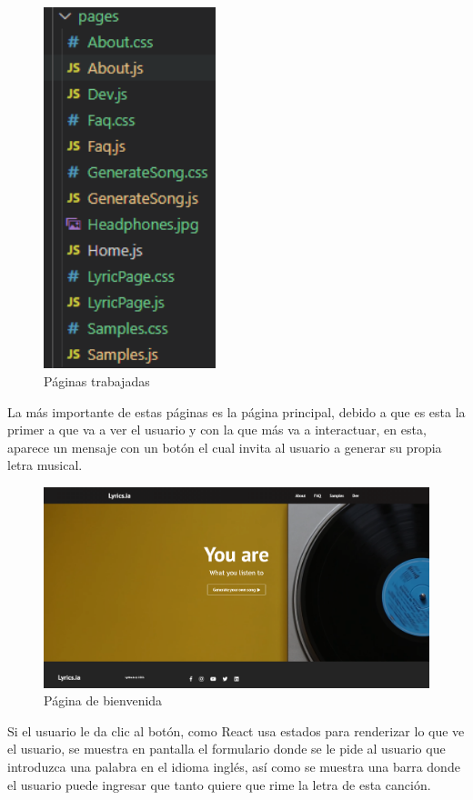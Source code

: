\documentclass[12pt, a4paper, titlepage]{article}
\begin{document}
	\begin{figure}[H]
		\includegraphics[width=5cm]{./Imagenes/AplicacionWeb/Paginas.png}
		\centering 
		\caption{Páginas trabajadas}
	\end{figure}
	La más importante de estas páginas es la página principal, debido a que es esta la primer a que va a ver el usuario y con la que más va a interactuar, en esta, aparece un mensaje con un botón el cual invita al usuario a generar su propia letra musical.
	\begin{figure}[H]
		\includegraphics[width=13.5cm]{./Imagenes/AplicacionWeb/Pbienvenida.png}
		\centering 
		\caption{Página de bienvenida}
	\end{figure}
	Si el usuario le da clic al botón, como React usa estados para renderizar lo que ve el usuario, se muestra en pantalla el formulario donde se le pide al usuario que introduzca una palabra en el idioma inglés, así como se muestra una barra donde el usuario puede ingresar que tanto quiere que rime la letra de esta canción.
\end{document}
